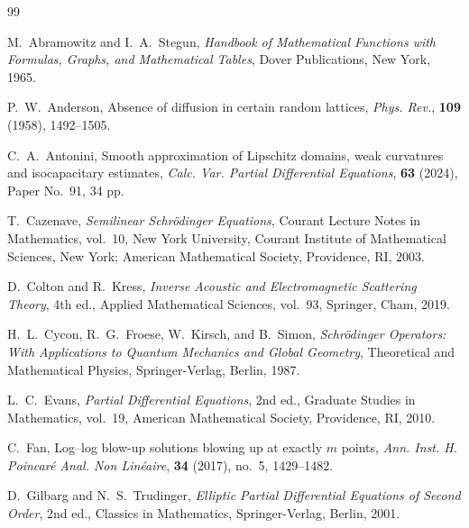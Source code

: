 \documentclass[11pt,reqno,oneside]{amsart}
\numberwithin{equation}{section}
\theoremstyle{definition}
\theoremstyle{remark}
\numberwithin{equation}{section}
\begin{document}
	\begin{thebibliography}{99}
		
		M.~Abramowitz and I.~A.~Stegun,
		\textit{Handbook of Mathematical Functions with Formulas, Graphs, and Mathematical Tables},
		Dover Publications, New York, 1965.
		
		P.~W.~Anderson,
		Absence of diffusion in certain random lattices,
		\textit{Phys. Rev.},
		\textbf{109} (1958), 1492--1505.
		
		C.~A.~Antonini,
		Smooth approximation of Lipschitz domains, weak curvatures and isocapacitary estimates,
		\textit{Calc. Var. Partial Differential Equations},
		\textbf{63} (2024), Paper No.~91, 34 pp.
		
		T.~Cazenave,
		\textit{Semilinear Schr\"odinger Equations},
		Courant Lecture Notes in Mathematics, vol.~10,
		New York University, Courant Institute of Mathematical Sciences, New York;
		American Mathematical Society, Providence, RI, 2003.
		
		D.~Colton and R.~Kress,
		\textit{Inverse Acoustic and Electromagnetic Scattering Theory},
		4th ed.,
		Applied Mathematical Sciences, vol.~93,
		Springer, Cham, 2019.
		
		H.~L.~Cycon, R.~G.~Froese, W.~Kirsch, and B.~Simon,
		\textit{Schr\"odinger Operators: With Applications to Quantum Mechanics and Global Geometry},
		Theoretical and Mathematical Physics,
		Springer-Verlag, Berlin, 1987.
		
		L.~C.~Evans,
		\textit{Partial Differential Equations},
		2nd ed.,
		Graduate Studies in Mathematics, vol.~19,
		American Mathematical Society, Providence, RI, 2010.
		
		C.~Fan,
		Log--log blow-up solutions blowing up at exactly \(m\) points,
		\textit{Ann. Inst. H. Poincar\'e Anal. Non Lin\'eaire},
		\textbf{34} (2017), no.~5, 1429--1482.
		
		D.~Gilbarg and N.~S.~Trudinger,
		\textit{Elliptic Partial Differential Equations of Second Order},
		2nd ed.,
		Classics in Mathematics,
		Springer-Verlag, Berlin, 2001.
		
		

\end{thebibliography}
\end{document}
